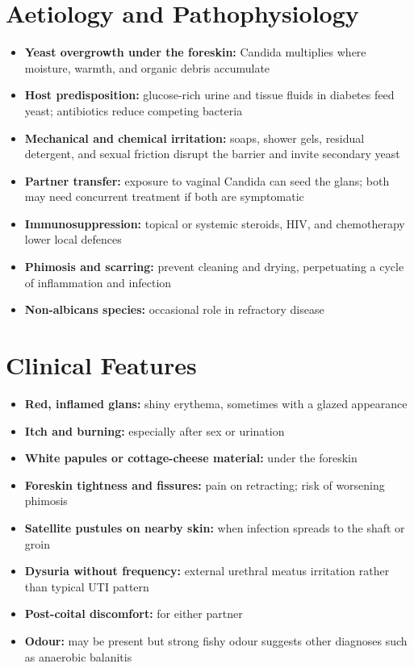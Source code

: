 \section*{Aetiology and Pathophysiology}
\begin{itemize}
    \item \textbf{Yeast overgrowth under the foreskin:} Candida multiplies where moisture, warmth, and organic debris accumulate
    \item \textbf{Host predisposition:} glucose-rich urine and tissue fluids in diabetes feed yeast; antibiotics reduce competing bacteria
    \item \textbf{Mechanical and chemical irritation:} soaps, shower gels, residual detergent, and sexual friction disrupt the barrier and invite secondary yeast
    \item \textbf{Partner transfer:} exposure to vaginal Candida can seed the glans; both may need concurrent treatment if both are symptomatic
    \item \textbf{Immunosuppression:} topical or systemic steroids, HIV, and chemotherapy lower local defences
    \item \textbf{Phimosis and scarring:} prevent cleaning and drying, perpetuating a cycle of inflammation and infection
    \item \textbf{Non-albicans species:} occasional role in refractory disease
\end{itemize}

\section*{Clinical Features}
\begin{itemize}
    \item \textbf{Red, inflamed glans:} shiny erythema, sometimes with a glazed appearance
    \item \textbf{Itch and burning:} especially after sex or urination
    \item \textbf{White papules or cottage-cheese material:} under the foreskin
    \item \textbf{Foreskin tightness and fissures:} pain on retracting; risk of worsening phimosis
    \item \textbf{Satellite pustules on nearby skin:} when infection spreads to the shaft or groin
    \item \textbf{Dysuria without frequency:} external urethral meatus irritation rather than typical UTI pattern
    \item \textbf{Post-coital discomfort:} for either partner
    \item \textbf{Odour:} may be present but strong fishy odour suggests other diagnoses such as anaerobic balanitis
\end{itemize}

